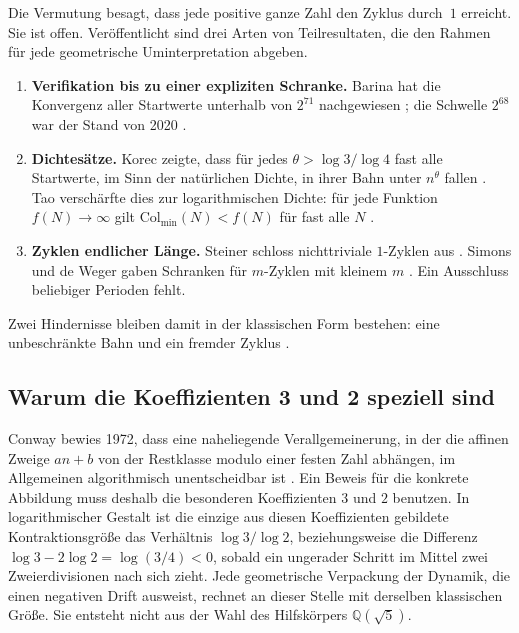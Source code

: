 \documentclass[11pt,a4paper]{article}
\theoremstyle{plain}
\theoremstyle{definition}
\newcommand{\Q}{\mathbb{Q}}
\numberwithin{equation}{section}
\begin{document}
Die Vermutung besagt, dass jede positive ganze Zahl den Zyklus durch~$1$
erreicht.
Sie ist offen.
Veröffentlicht sind drei Arten von Teilresultaten, die den Rahmen für jede
geometrische Uminterpretation abgeben.

\begin{enumerate}
\item \textbf{Verifikation bis zu einer expliziten Schranke.}
Barina hat die Konvergenz aller Startwerte unterhalb von $2^{71}$ nachgewiesen
\cite{Barina2025}; die Schwelle $2^{68}$ war der Stand von 2020 \cite{Barina2021}.
\item \textbf{Dichtesätze.}
Korec zeigte, dass für jedes $\theta>\log 3/\log 4$ fast alle Startwerte,
im Sinn der natürlichen Dichte, in ihrer Bahn unter $n^{\theta}$ fallen
\cite{Korec1994}.
Tao verschärfte dies zur logarithmischen Dichte: für jede Funktion
$f(N)\to\infty$ gilt $\mathrm{Col}_{\min}(N)<f(N)$ für fast alle $N$
\cite{Tao2019}.
\item \textbf{Zyklen endlicher Länge.}
Steiner schloss nichttriviale $1$-Zyklen aus \cite{Steiner1977}.
Simons und de Weger gaben Schranken für $m$-Zyklen mit kleinem $m$
\cite{SimonsDeWeger2005}.
Ein Ausschluss beliebiger Perioden fehlt.
\end{enumerate}

Zwei Hindernisse bleiben damit in der klassischen Form bestehen: eine
unbeschränkte Bahn und ein fremder Zyklus \cite{Lagarias1985,CollatzE8}.

\subsection{Warum die Koeffizienten 3 und 2 speziell sind}

Conway bewies 1972, dass eine naheliegende Verallgemeinerung, in der die
affinen Zweige $an+b$ von der Restklasse modulo einer festen Zahl abhängen,
im Allgemeinen algorithmisch unentscheidbar ist \cite{Conway1972}.
Ein Beweis für die konkrete Abbildung muss deshalb die besonderen Koeffizienten
$3$ und $2$ benutzen.
In logarithmischer Gestalt ist die einzige aus diesen Koeffizienten gebildete
Kontraktionsgröße das Verhältnis $\log 3/\log 2$, beziehungsweise die
Differenz $\log 3-2\log 2=\log(3/4)<0$, sobald ein ungerader Schritt im Mittel
zwei Zweierdivisionen nach sich zieht.
Jede geometrische Verpackung der Dynamik, die einen negativen Drift ausweist,
rechnet an dieser Stelle mit derselben klassischen Größe.
Sie entsteht nicht aus der Wahl des Hilfskörpers $\Q(\sqrt{5})$.
\end{document}
